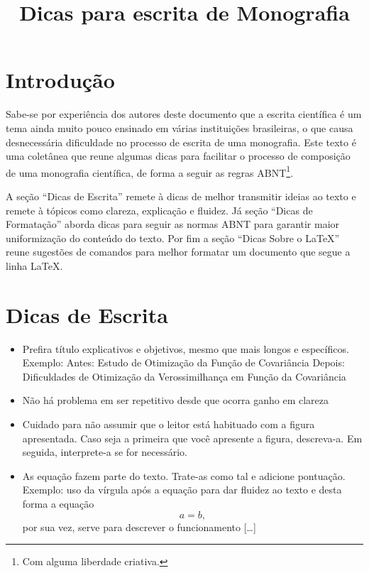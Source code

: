 \documentclass{article}
\title{Dicas para escrita de Monografia}
\date{}
\begin{document}
\maketitle
\section{Introdução} \label{sec:intro}

Sabe-se por experiência dos autores deste documento que a escrita científica é um tema ainda muito pouco ensinado em várias instituições brasileiras, o que causa desnecessária dificuldade no processo de escrita de uma monografia. Este texto é uma coletânea que reune algumas dicas para facilitar o processo de composição de uma monografia científica, de forma a seguir as regras ABNT\footnote{Com alguma liberdade criativa.}. 

A seção ``Dicas de Escrita'' remete à dicas de melhor transmitir ideias ao texto e remete à tópicos como clareza, explicação e fluidez. Já seção ``Dicas de Formatação'' aborda dicas para seguir as normas ABNT para garantir maior uniformização do conteúdo do texto. Por fim a seção ``Dicas Sobre o \LaTeX'' reune sugestões de comandos para melhor formatar um documento que segue a linha \LaTeX.

\pagebreak

\section{Dicas de Escrita} \label{sec:dicas_escrita}

\begin{itemize}
  \item Prefira título explicativos e objetivos, mesmo que mais longos e específicos. Exemplo:
    \subitem Antes: Estudo de Otimização da Função de Covariância
    \subitem Depois:  Dificuldades de Otimização da Verossimilhança em Função da Covariância
  \item Não há problema em ser repetitivo desde que ocorra ganho em clareza
  \item Cuidado para não assumir que o leitor está habituado com a figura apresentada. Caso seja a primeira que você apresente a figura, descreva-a. Em seguida, interprete-a se for necessário.
  \item As equação fazem parte do texto. Trate-as como tal e adicione pontuação. 
    \subitem Exemplo: uso da vírgula após a equação para dar fluidez ao texto
    \subitem [\dots] e desta forma a equação $$a = b,$$ por sua vez, serve para descrever o funcionamento [\dots]
\end{itemize}
\end{document}
